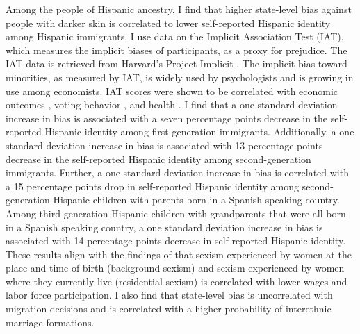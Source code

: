 \documentclass[12pt, fullpage]{article}
\begin{document}
Among the people of Hispanic ancestry, I find that higher state-level bias against people with darker skin is correlated to lower self-reported Hispanic identity among Hispanic immigrants. I use data on the Implicit Association Test (IAT), which measures the implicit biases of participants, as a proxy for prejudice. The IAT data is retrieved from Harvard's Project Implicit \citep{greenwaldMeasuringIndividualDifferences1998}. The implicit bias toward minorities, as measured by IAT, is widely used by psychologists and is growing in use among economists. IAT scores were shown to be correlated with economic outcomes \citep{chettyRaceEconomicOpportunity2020,gloverDiscriminationSelfFulfillingProphecy2017}, voting behavior \citep{friesePredictingVotingBehavior2007}, and health \citep{leitnerRacialBiasAssociated2016}. I find that a one standard deviation increase in bias is associated with a seven percentage points decrease in the self-reported Hispanic identity among first-generation immigrants. Additionally,  a one standard deviation increase in bias is associated with 13 percentage points decrease in the self-reported Hispanic identity among second-generation immigrants. Further, a one standard deviation increase in bias is correlated with a 15 percentage points drop in self-reported Hispanic identity among second-generation Hispanic children with parents born in a Spanish speaking country. Among third-generation Hispanic children with grandparents that were all born in a Spanish speaking country, a one standard deviation increase in bias is associated with 14 percentage points decrease in self-reported Hispanic identity. These results align with the findings of \citet{charlesEffectsSexismAmerican2018} that sexism experienced by women at the place and time of birth (background sexism) and sexism experienced by women where they currently live (residential sexism) is correlated with lower wages and labor force participation. I also find that state-level bias is uncorrelated with migration decisions and is correlated with a higher probability of interethnic marriage formations.
\end{document}
